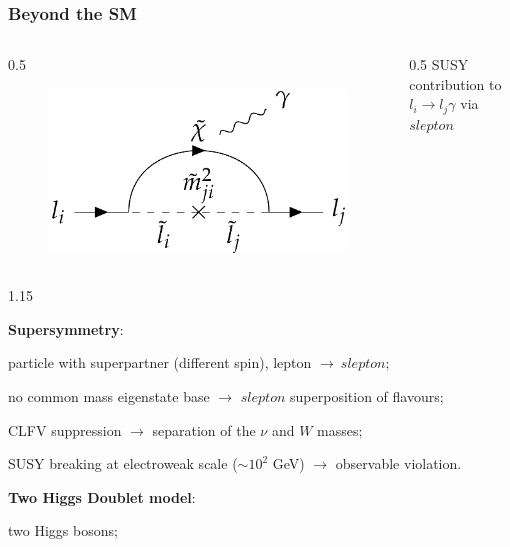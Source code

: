 \documentclass{beamer}
\begin{document}
\begin{frame}
    \frametitle{Beyond the SM}
    \vspace{-3mm}
    \begin{columns}
        \begin{column}{0.5\framewidth}
    \begin{figure}[!h]
        \centering
        \includegraphics[width =0.55\columnwidth]{figures/png/Screenshot_20240218_105920.png}
        \label{fig:susy}
        \end{figure}
    \end{column}
    \begin{column}{0.5\framewidth}
   {\small SUSY contribution to $l_i \rightarrow l_j\gamma$ via $slepton$ }
    \end{column}
\end{columns}
\vspace{-3mm}
        \begin{columns}
            \begin{column}{1.15\framewidth}
            \setlength{\leftmargini}{1.1em}
        \begin{itemize}
    {\footnotesize   \item  \textbf{Supersymmetry}:} 
    \begin{itemize}
        {\footnotesize \item particle with superpartner (different spin), lepton $\rightarrow \ slepton$;
        \item no common mass eigenstate base $\rightarrow$ 
        $slepton$ superposition of flavours;
        \item CLFV suppression $\rightarrow$ separation of the $\nu$ and $W$ masses;
        \item SUSY breaking at electroweak scale ($\sim 10^2$ GeV) $\rightarrow$ observable 
        violation. 
        }
    \end{itemize}
    {\footnotesize  \item \textbf{Two Higgs Doublet model}:}
    \begin{itemize}
        {\footnotesize  \item  two Higgs bosons;
}
\end{itemize}
\end{itemize}
\end{column}
\end{columns}
\end{frame}
\end{document}
